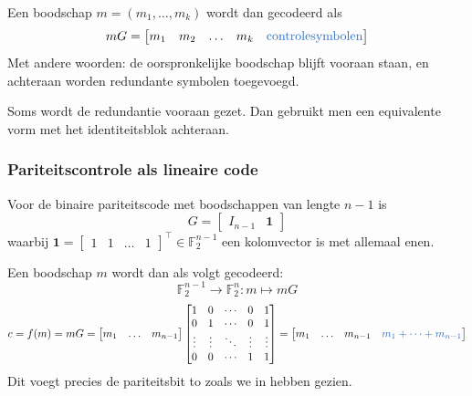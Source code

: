 Een boodschap $m = (m_1, \dots, m_k)$ wordt dan gecodeerd als
\begin{equation*}
    mG = \begin{bmatrix}
        m_1 & m_2 & \dots & m_k & \textcolor{NavyBlue}{\text{controlesymbolen}}
    \end{bmatrix}
\end{equation*}
Met andere woorden: de oorspronkelijke boodschap blijft vooraan staan, en achteraan worden redundante symbolen toegevoegd.

Soms wordt de redundantie vooraan gezet. Dan gebruikt men een equivalente vorm met het identiteitsblok achteraan.

\subsubsection{Pariteitscontrole als lineaire code}

Voor de binaire pariteitscode met boodschappen van lengte $n-1$ is
\begin{equation*}
    G = \begin{bmatrix}
        I_{n-1} & \mathbf{1}
    \end{bmatrix}
\end{equation*}
waarbij $\mathbf{1} = \begin{bmatrix}
    1 & 1 & \dots & 1
\end{bmatrix}^\top \in \mathbb{F}_2^{n-1}$ een kolomvector is met allemaal enen.

Een boodschap $m$ wordt dan als volgt gecodeerd:
\begin{equation*}
    \mathbb{F}_2^{n-1} \to \mathbb{F}_2^n : m \mapsto mG
\end{equation*}
\begin{equation*}
    c = f(m) = mG = \begin{bmatrix}
        m_1 & \dots & m_{n-1}
    \end{bmatrix} \begin{bmatrix}
        1 & 0 & \cdots & 0 & 1 \\
        0 & 1 & \cdots & 0 & 1 \\
        \vdots & \vdots & \ddots & \vdots & \vdots \\
        0 & 0 & \cdots & 1 & 1
    \end{bmatrix} = \begin{bmatrix}
        m_1 & \dots & m_{n-1} & \textcolor{NavyBlue}{m_1 + \dots + m_{n-1}}
    \end{bmatrix}
\end{equation*}
Dit voegt precies de pariteitsbit to zoals we in  hebben gezien.

